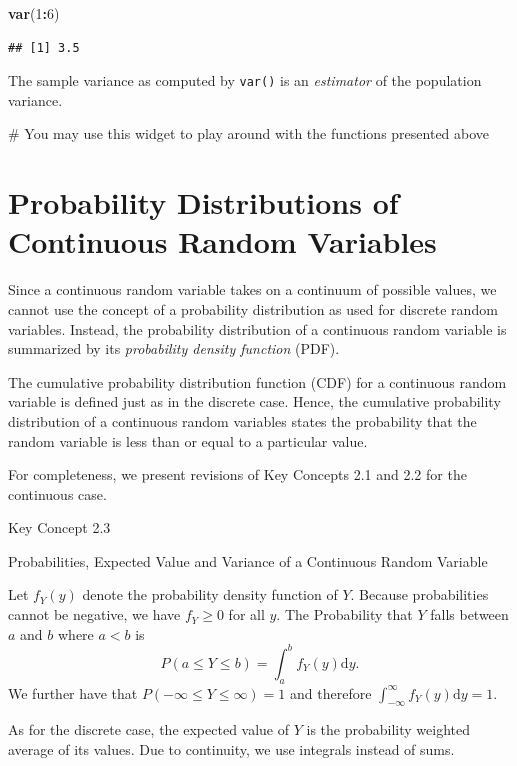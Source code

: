 \documentclass[]{book}
\newenvironment{Shaded}{\begin{snugshade}}{\end{snugshade}}
\newcommand{\KeywordTok}[1]{\textcolor[rgb]{0.13,0.29,0.53}{\textbf{#1}}}
\newcommand{\DecValTok}[1]{\textcolor[rgb]{0.00,0.00,0.81}{#1}}
\newcommand{\OperatorTok}[1]{\textcolor[rgb]{0.81,0.36,0.00}{\textbf{#1}}}
\newcommand{\NormalTok}[1]{#1}
\theoremstyle{definition}
\theoremstyle{definition}
\theoremstyle{definition}
\theoremstyle{remark}
\begin{document}
\begin{Shaded}
\begin{Highlighting}[]
\KeywordTok{var}\NormalTok{(}\DecValTok{1}\OperatorTok{:}\DecValTok{6}\NormalTok{)}
\end{Highlighting}
\end{Shaded}

\begin{verbatim}
## [1] 3.5
\end{verbatim}

The sample variance as computed by \texttt{var()} is an \emph{estimator}
of the population variance.

 \# You may use this widget to play around with the functions presented
above

\section{Probability Distributions of Continuous Random
Variables}\label{probability-distributions-of-continuous-random-variables}

Since a continuous random variable takes on a continuum of possible
values, we cannot use the concept of a probability distribution as used
for discrete random variables. Instead, the probability distribution of
a continuous random variable is summarized by its \emph{probability
density function} (PDF).

The cumulative probability distribution function (CDF) for a continuous
random variable is defined just as in the discrete case. Hence, the
cumulative probability distribution of a continuous random variables
states the probability that the random variable is less than or equal to
a particular value.

For completeness, we present revisions of Key Concepts 2.1 and 2.2 for
the continuous case.

Key Concept 2.3

Probabilities, Expected Value and Variance of a Continuous Random
Variable

Let \(f_Y(y)\) denote the probability density function of \(Y\). Because
probabilities cannot be negative, we have \(f_Y\geq 0\) for all \(y\).
The Probability that \(Y\) falls between \(a\) and \(b\) where \(a < b\)
is \[ P(a \leq Y \leq b) = \int_a^b f_Y(y) \mathrm{d}y. \] We further
have that \(P(-\infty \leq Y \leq \infty) = 1\) and therefore
\(\int_{-\infty}^{\infty} f_Y(y) \mathrm{d}y = 1\).

As for the discrete case, the expected value of \(Y\) is the probability
weighted average of its values. Due to continuity, we use integrals
instead of sums.
\end{document}
